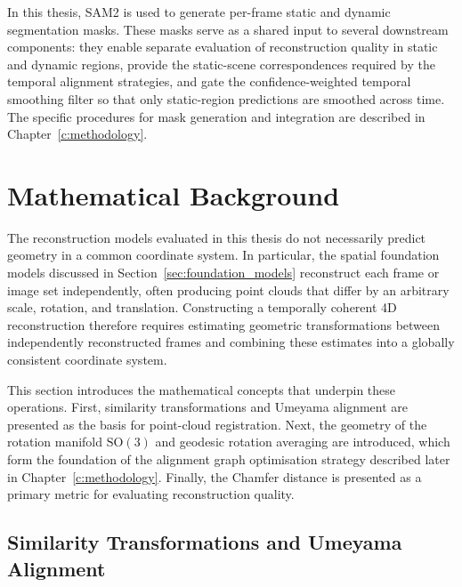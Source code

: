 In this thesis, SAM2 is used to generate per-frame static and dynamic segmentation masks. These masks serve as a shared input to several downstream components: they enable separate evaluation of reconstruction quality in static and dynamic regions, provide the static-scene correspondences required by the temporal alignment strategies, and gate the confidence-weighted temporal smoothing filter so that only static-region predictions are smoothed across time. The specific procedures for mask generation and integration are described in Chapter~\ref{c:methodology}.

\section{Mathematical Background}
\label{sec:math_background}

The reconstruction models evaluated in this thesis do not necessarily predict geometry in a common coordinate system. In particular, the spatial foundation models discussed in Section~\ref{sec:foundation_models} reconstruct each frame or image set independently, often producing point clouds that differ by an arbitrary scale, rotation, and translation. Constructing a temporally coherent 4D reconstruction therefore requires estimating geometric transformations between independently reconstructed frames and combining these estimates into a globally consistent coordinate system.

This section introduces the mathematical concepts that underpin these operations. First, similarity transformations and Umeyama alignment are presented as the basis for point-cloud registration. Next, the geometry of the rotation manifold $\mathrm{SO}(3)$ and geodesic rotation averaging are introduced, which form the foundation of the alignment graph optimisation strategy described later in Chapter~\ref{c:methodology}. Finally, the Chamfer distance is presented as a primary metric for evaluating reconstruction quality.

\subsection{Similarity Transformations and Umeyama Alignment}

